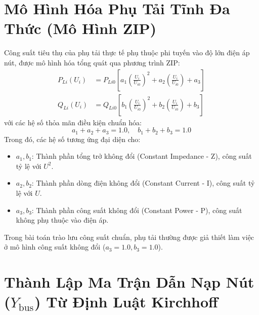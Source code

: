 \documentclass[12pt,a4paper,oneside]{report}
\begin{document}
\section{Mô Hình Hóa Phụ Tải Tĩnh Đa Thức (Mô Hình ZIP)}
Công suất tiêu thụ của phụ tải thực tế phụ thuộc phi tuyến vào độ lớn điện áp nút, được mô hình hóa tổng quát qua phương trình ZIP:
\begin{align}
P_{Li}(U_i) &= P_{Li0} \left[ a_1 \left( \frac{U_i}{U_{i0}} \right)^2 + a_2 \left( \frac{U_i}{U_{i0}} \right) + a_3 \right] \\
Q_{Li}(U_i) &= Q_{Li0} \left[ b_1 \left( \frac{U_i}{U_{i0}} \right)^2 + b_2 \left( \frac{U_i}{U_{i0}} \right) + b_3 \right]
\end{align}
với các hệ số thỏa mãn điều kiện chuẩn hóa:
\begin{equation}
a_1 + a_2 + a_3 = 1.0, \quad b_1 + b_2 + b_3 = 1.0
\end{equation}
Trong đó, các hệ số tương ứng đại diện cho:
\begin{itemize}
    \item $a_1, b_1$: Thành phần tổng trở không đổi (Constant Impedance - Z), công suất tỷ lệ với $U^2$.
    \item $a_2, b_2$: Thành phần dòng điện không đổi (Constant Current - I), công suất tỷ lệ với $U$.
    \item $a_3, b_3$: Thành phần công suất không đổi (Constant Power - P), công suất không phụ thuộc vào điện áp.
\end{itemize}
Trong bài toán trào lưu công suất chuẩn, phụ tải thường được giả thiết làm việc ở mô hình công suất không đổi ($a_3 = 1.0, b_3 = 1.0$).

\section{Thành Lập Ma Trận Dẫn Nạp Nút ($Y_{\text{bus}}$) Từ Định Luật Kirchhoff}
\end{document}
